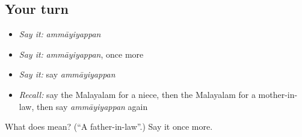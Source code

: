 \subsection*{Your turn}
\begin{itemize}
\raggedright
  \item \emph{Say it:} \emph{ammāyiyappan}
  \item \emph{Say it:} \emph{ammāyiyappan}, once more
  \item \emph{Say it:} say \emph{ammāyiyappan}
  \item \emph{Recall:} say the Malayalam for a niece, then the Malayalam for a mother-in-law, then say \emph{ammāyiyappan} again
\end{itemize}

\begin{tcolorbox}[breakable,colback=teal!4,colframe=teal!35!black,title={Before you move on}]
What does  mean? (\textquotedblleft{}A father-in-law\textquotedblright{}.) Say it once more.
\end{tcolorbox}
